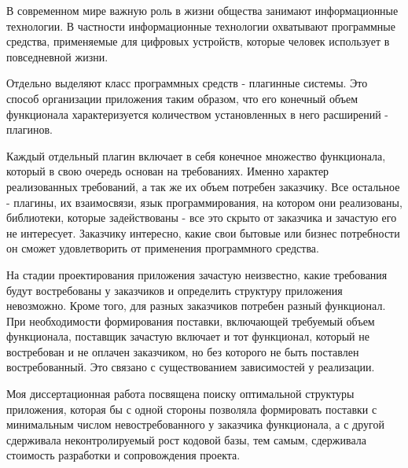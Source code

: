 В современном мире важную роль в жизни общества занимают информационные технологии. В частности информационные технологии охватывают программные средства, применяемые для цифровых устройств, которые человек использует в повседневной жизни.

Отдельно выделяют класс программных средств - плагинные системы. Это способ организации приложения таким образом, что его конечный объем функционала характеризуется количеством установленных в него расширений - плагинов.

Каждый отдельный плагин включает в себя конечное множество функционала, который в свою очередь основан на требованиях. Именно характер реализованных требований, а так же их объем потребен заказчику. Все остальное - плагины, их взаимосвязи, язык программирования, на котором они реализованы, библиотеки, которые задействованы - все это скрыто от заказчика и зачастую его не интересует. Заказчику интересно, какие свои бытовые или бизнес потребности он сможет удовлетворить от применения программного средства.

На стадии проектирования приложения зачастую неизвестно, какие требования будут востребованы у заказчиков и определить структуру приложения невозможно. Кроме того, для разных заказчиков потребен разный функционал. При необходимости формирования поставки, включающей требуемый объем функционала, поставщик зачастую включает и тот функционал, который не востребован и не оплачен заказчиком, но без которого не быть поставлен востребованный. Это связано с существованием зависимостей у реализации.

Моя диссертационная работа посвящена поиску оптимальной структуры приложения, которая бы с одной стороны позволяла формировать поставки с минимальным числом невостребованного у заказчика функционала, а с другой сдерживала неконтролируемый рост кодовой базы, тем самым, сдерживала стоимость разработки и сопровождения проекта.